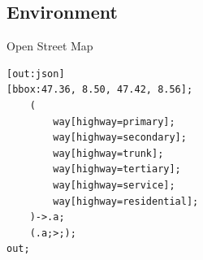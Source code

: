 \subsection{Environment}
\begin{frame}{Open Street Map}

 
\begin{lstlisting}[breakindent=0pt, tabsize=1]
[out:json]
[bbox:47.36, 8.50, 47.42, 8.56];
    (
        way[highway=primary];
        way[highway=secondary];
        way[highway=trunk];
        way[highway=tertiary];
        way[highway=service];
        way[highway=residential];
    )->.a;
    (.a;>;);
out;
\end{lstlisting}

\end{frame}


